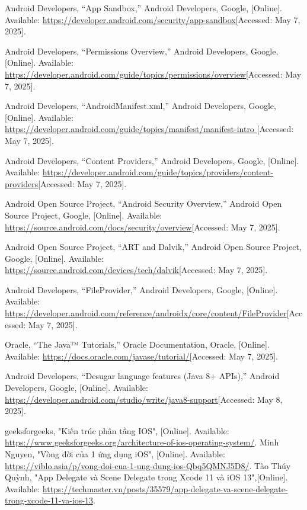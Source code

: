 \documentclass[12pt]{report}
\begin{document}
\begin{thebibliography}{1}
  Android Developers, “App Sandbox,” Android Developers, Google, [Online]. Available: \url{https://developer.android.com/security/app-sandbox}[Accessed: May 7, 2025].
  
  Android Developers, “Permissions Overview,” Android Developers, Google, [Online]. Available: \url{https://developer.android.com/guide/topics/permissions/overview}[Accessed: May 7, 2025].
  
  Android Developers, “AndroidManifest.xml,” Android Developers, Google, [Online]. Available: \url{https://developer.android.com/guide/topics/manifest/manifest-intro }[Accessed: May 7, 2025].
   
  Android Developers, “Content Providers,” Android Developers, Google, [Online]. Available: \url{https://developer.android.com/guide/topics/providers/content-providers}[Accessed: May 7, 2025].
  
  Android Open Source Project, “Android Security Overview,” Android Open Source Project, Google, [Online]. Available: \url{https://source.android.com/docs/security/overview}[Accessed: May 7, 2025].
 
  Android Open Source Project, “ART and Dalvik,” Android Open Source Project, Google, [Online]. Available: \url{https://source.android.com/devices/tech/dalvik}[Accessed: May 7, 2025].
 
  Android Developers, “FileProvider,” Android Developers, Google, [Online]. Available: \url{https://developer.android.com/reference/androidx/core/content/FileProvider}[Accessed: May 7, 2025].
 
  Oracle, “The Java™ Tutorials,” Oracle Documentation, Oracle, [Online]. Available: \url{https://docs.oracle.com/javase/tutorial/}[Accessed: May 7, 2025].
 
  Android Developers, “Desugar language features (Java 8+ APIs),” Android Developers, Google, [Online]. Available: \url{https://developer.android.com/studio/write/java8-support}[Accessed: May 8, 2025].
 
  
 geeksforgeeks, "Kiến trúc phân tầng IOS", [Online]. Available: \url{https://www.geeksforgeeks.org/architecture-of-ios-operating-system/}.
  Minh Nguyen, "Vòng đời của 1 ứng dụng iOS", [Online]. Available: \url{https://viblo.asia/p/vong-doi-cua-1-ung-dung-ios-Qbq5QMNJ5D8/}.
Tào Thúy Quỳnh, "App Delegate và Scene Delegate trong Xcode 11 và iOS 13",[Online]. Available: \url{https://techmaster.vn/posts/35579/app-delegate-va-scene-delegate-trong-xcode-11-va-ios-13}.


\end{thebibliography}
\end{document}
